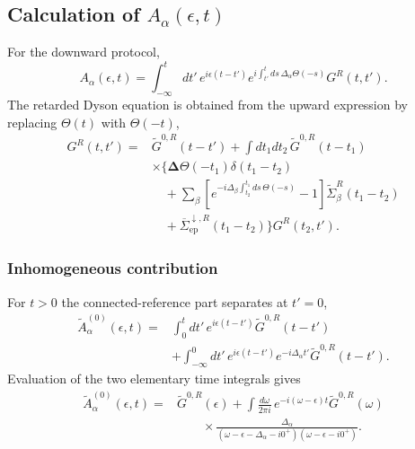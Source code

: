 \documentclass[
 reprint,
 superscriptaddress,
 amsmath,amssymb,
 aps,prb,
 longbibliography,
 floatfix
]{revtex4-2}
\newcommand{\ep}{\mathrm{ep}}
\newcommand{\barSigma}{\overline{\Sigma}}
\begin{document}
\subsection{Calculation of $A_\alpha(\epsilon,t)$}
\label{sec:down-A}

For the downward protocol,
\begin{equation*}
A_\alpha(\epsilon,t)
=
\int_{-\infty}^{t}dt'\,
e^{i\epsilon(t-t')}
e^{i\int_{t'}^{t}ds\,
\Delta_\alpha\Theta(-s)}
G^R(t,t').
\end{equation*}
The retarded Dyson equation is obtained from the upward expression by replacing $\Theta(t)$ with $\Theta(-t)$,
\begin{equation*}
\begin{aligned}
G^R(t,t')
={}&
\widetilde G^{0,R}(t-t')
+
\int dt_1dt_2\,
\widetilde G^{0,R}(t-t_1)
\\
&\times
\Bigg\{
\bm\Delta\Theta(-t_1)
\delta(t_1-t_2)
\\
&\quad+
\sum_\beta
\left[
e^{-i\Delta_\beta
\int_{t_2}^{t_1}ds\,\Theta(-s)}
-1
\right]
\widetilde\Sigma_\beta^R(t_1-t_2)
\\
&\quad+
\barSigma_{\ep}^{\downarrow,R}(t_1-t_2)
\Bigg\}
G^R(t_2,t').
\end{aligned}
\end{equation*}

\subsubsection{Inhomogeneous contribution}

For $t>0$ the connected-reference part separates at $t'=0$,
\begin{align*}
\widetilde A_\alpha^{(0)}(\epsilon,t)
={}&
\int_0^t dt'\,
e^{i\epsilon(t-t')}
\widetilde G^{0,R}(t-t')
\\
&+
\int_{-\infty}^{0}dt'\,
e^{i\epsilon(t-t')}
e^{-i\Delta_\alpha t'}
\widetilde G^{0,R}(t-t').
\end{align*}
Evaluation of the two elementary time integrals gives
\begin{equation*}
\begin{aligned}
\widetilde A_\alpha^{(0)}(\epsilon,t)
={}&
\widetilde G^{0,R}(\epsilon)
+
\int\frac{d\omega}{2\pi i}\,
e^{-i(\omega-\epsilon)t}
\widetilde G^{0,R}(\omega)
\\
&\qquad\times
\frac{\Delta_\alpha}
{
(\omega-\epsilon-\Delta_\alpha-i0^+)
(\omega-\epsilon-i0^+)
}.
\end{aligned}
\end{equation*}
\end{document}
